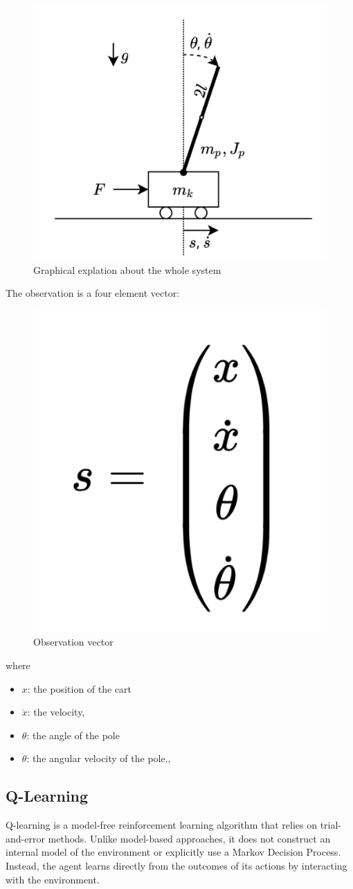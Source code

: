 \documentclass{article}
\begin{document}
\begin{figure}[h]
	\centering
	\includegraphics[width=0.5\linewidth]{../data/images/cart.png}
	\caption{Graphical explation about the whole system}
	\label{fig:plot1}
\end{figure}

\newpage

The observation is a four element vector: 
\begin{figure}[h]
	\centering
	\includegraphics[width=0.2\linewidth]{../data/images/vector.png}
	\caption{Observation vector}
	\label{fig:plot1}
\end{figure}

where 
\begin{itemize}
	\item $x$: the position of the cart
	\item $\dot{x}$: the velocity, 
	\item $\theta$:  the angle of the pole
	\item $\dot{\theta}$: the angular velocity of the pole., 	
\end{itemize}

\subsection{Q-Learning}
Q-learning is a model-free reinforcement learning algorithm that relies on trial-and-error methods. Unlike model-based approaches, it does not construct an internal model of the environment or explicitly use a Markov Decision Process. Instead, the agent learns directly from the outcomes of its actions by interacting with the environment.
\end{document}
